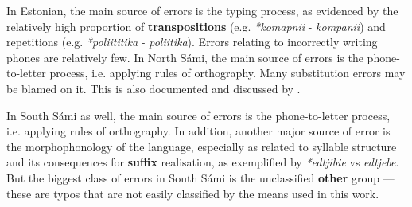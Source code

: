 \documentclass{flammie}
\begin{document}
In Estonian, the main source of errors is the typing process, as evidenced by
the relatively high proportion of \textbf{transpositions} (e.g.
\textit{*komapnii} - \textit{kompanii}) and repetitions (e.g.
\textit{*poliititika} - \textit{poliitika}). Errors relating to incorrectly
writing phones are relatively few.  In North Sámi, the main source of errors is
the phone-to-letter process, i.e. applying rules of orthography. Many
substitution errors may be blamed on it. This is also documented and discussed
by \cite{antonsen2013}.

In South Sámi as well, the main source of errors is the phone-to-letter process,
i.e. applying rules of orthography. In addition, another major source of error
is the morphophonology of the language, especially as related to syllable
structure and its consequences for \textbf{suffix} realisation, as exemplified
by \textit{*edtjibie} vs \textit{edtjebe}. But the biggest class of errors in
South Sámi is the unclassified \textbf{other} group --- these are typos that are
not easily classified by the means used in this work.
\end{document}
